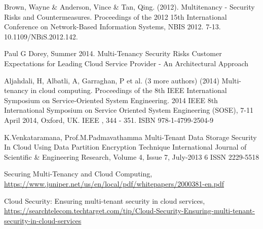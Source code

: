 \documentclass[twoside,twocolumn]{article}
\begin{document}
\begin{thebibliography}{99} %

 Brown, Wayne \& Anderson, Vince \& Tan, Qing. (2012).
\newblock Multitenancy - Security Risks and Countermeasures. 
\newblock Proceedings of the 2012 15th International Conference on Network-Based Information Systems, NBIS 2012. 7-13. 10.1109/NBiS.2012.142. 

 Paul G Dorey, Summer 2014.
\newblock Multi-Tenancy Security Risks 
\newblock Customer Expectations for Leading Cloud Service Provider - An Architectural Approach 
 
   Aljahdali, H, Albatli, A, Garraghan, P et al. (3 more authors) (2014)
\newblock Multi-tenancy in cloud computing.
\newblock Proceedings of the 8th IEEE International Symposium on Service-Oriented System Engineering. 2014 IEEE 8th International Symposium on Service Oriented System Engineering (SOSE), 7-11 April 2014, Oxford, UK. IEEE , 344 - 351. ISBN 978-1-4799-2504-9
 
 K.Venkataramana, Prof.M.Padmavathamma
\newblock Multi-Tenant Data Storage Security In Cloud Using Data Partition Encryption Technique 
\newblock International Journal of Scientific \& Engineering Research, Volume 4, Issue 7, July-2013 6
ISSN 2229-5518 
 
  Securing Multi-Tenancy and Cloud Computing,  \url{https://www.juniper.net/us/en/local/pdf/whitepapers/2000381-en.pdf}
 
  Cloud Security: Ensuring multi-tenant security in cloud services, 
\url{https://searchtelecom.techtarget.com/tip/Cloud-Security-Ensuring-multi-tenant-security-in-cloud-services}


\end{thebibliography}

\end{document}
